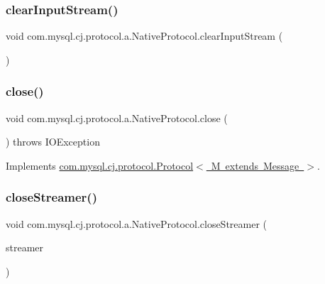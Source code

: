 \subsubsection{\texorpdfstring{clear\+Input\+Stream()}{clearInputStream()}}
{\footnotesize\ttfamily void com.\+mysql.\+cj.\+protocol.\+a.\+Native\+Protocol.\+clear\+Input\+Stream (\begin{DoxyParamCaption}{ }\end{DoxyParamCaption})}

\mbox{\label{classcom_1_1mysql_1_1cj_1_1protocol_1_1a_1_1_native_protocol_a74b35f6ae7f3feb2baeee7a845c82085}} 
\subsubsection{\texorpdfstring{close()}{close()}}
{\footnotesize\ttfamily void com.\+mysql.\+cj.\+protocol.\+a.\+Native\+Protocol.\+close (\begin{DoxyParamCaption}{ }\end{DoxyParamCaption}) throws I\+O\+Exception}



Implements \mbox{\hyperlink{interfacecom_1_1mysql_1_1cj_1_1protocol_1_1_protocol_ac38e74b2af853f10e7f9a97f6c4836f8}{com.\+mysql.\+cj.\+protocol.\+Protocol$<$ M extends Message $>$}}.

\mbox{\label{classcom_1_1mysql_1_1cj_1_1protocol_1_1a_1_1_native_protocol_a11aa5581264828320440e37d871816df}} 
\subsubsection{\texorpdfstring{close\+Streamer()}{closeStreamer()}}
{\footnotesize\ttfamily void com.\+mysql.\+cj.\+protocol.\+a.\+Native\+Protocol.\+close\+Streamer (\begin{DoxyParamCaption}\item[{\mbox{\hyperlink{interfacecom_1_1mysql_1_1cj_1_1protocol_1_1_resultset_rows}{Resultset\+Rows}}}]{streamer }\end{DoxyParamCaption})}

